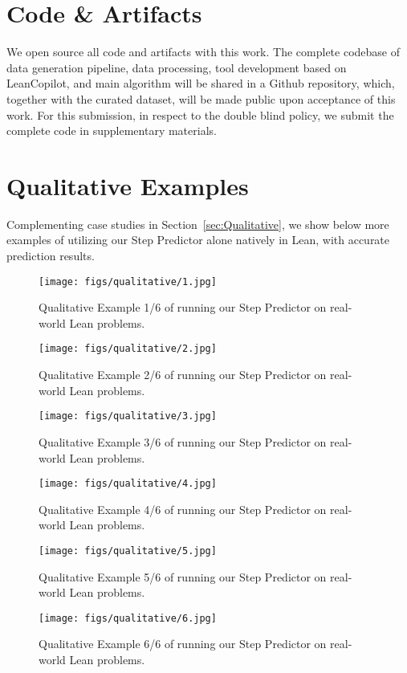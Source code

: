 \section{Code \& Artifacts}
\label{apx:appendix}

We open source all code and artifacts with this work. The complete codebase of data generation pipeline, data processing, tool development based on LeanCopilot, and main algorithm will be shared in a Github repository, which, together with the curated dataset, will be made public upon acceptance of this work. For this submission, in respect to the double blind policy, we submit the complete code in supplementary materials.

\section{Qualitative Examples}

Complementing case studies in Section~\ref{sec:Qualitative}, we show below more examples of utilizing our Step Predictor alone natively in Lean, with accurate prediction results. 

\begin{figure}[h]
    \centering
    \texttt{[image: figs/qualitative/1.jpg]}
    \caption{Qualitative Example 1/6 of running our Step Predictor on real-world Lean problems.}
    \label{fig:q1}
\end{figure}

\begin{figure}[h]
    \centering
    \texttt{[image: figs/qualitative/2.jpg]}
    \caption{Qualitative Example 2/6 of running our Step Predictor on real-world Lean problems.}
    \label{fig:q2}
\end{figure}

\begin{figure}[h]
    \centering
    \texttt{[image: figs/qualitative/3.jpg]}
    \caption{Qualitative Example 3/6 of running our Step Predictor on real-world Lean problems.}
    \label{fig:q3}
\end{figure}

\begin{figure}[h]
    \centering
    \texttt{[image: figs/qualitative/4.jpg]}
    \caption{Qualitative Example 4/6 of running our Step Predictor on real-world Lean problems.}
    \label{fig:q4}
\end{figure}

\begin{figure}[h]
    \centering
    \texttt{[image: figs/qualitative/5.jpg]}
    \caption{Qualitative Example 5/6 of running our Step Predictor on real-world Lean problems.}
    \label{fig:q5}
\end{figure}

\begin{figure}[h]
    \centering
    \texttt{[image: figs/qualitative/6.jpg]}
    \caption{Qualitative Example 6/6 of running our Step Predictor on real-world Lean problems.}
    \label{fig:q6}
\end{figure}
